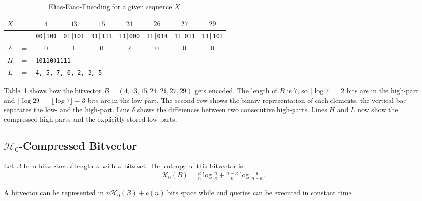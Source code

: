 \begin{Example}
  \begin{table}[htbp]
    \centering
    \begin{tabular}{ccccccccc}
      \toprule
      $X$ & $=$ & $4$ & $13$ & $15$ & $24$ & $26$ & $27$ & $29$ \\
      \midrule
      & &
      \texttt{00|100} &
      \texttt{01|101} &
      \texttt{01|111} &
      \texttt{11|000} &
      \texttt{11|010} &
      \texttt{11|011} &
      \texttt{11|101} \\

      $\delta$ & $=$ & $0$ & $1$ & $0$ & $2$ & $0$ & $0$ & $0$ \\
      $H$ & $=$ & \multicolumn{7}{l}{\texttt{1011001111}} \\
      $L$ & $=$ & \multicolumn{7}{l}{\texttt{4, 5, 7, 0, 2, 3, 5}} \\
      \bottomrule
    \end{tabular}
    \caption{Elias-Fano-Encoding for a given sequence $X$.}
    \label{tbl:eliasFanoExample}
  \end{table}
  Table~\ref{tbl:eliasFanoExample} shows how the bitvector $B=(4,13,15,24,26,27,29)$ gets encoded. The length of $B$ is $7$, so $\lfloor \log 7 \rfloor = 2$ bits are in the high-part and $\lceil \log 29 \rceil - \lfloor \log 7 \rfloor = 3$ bits are in the low-part. The second row shows the binary representation of each elements, the vertical bar separates the low- and the high-part. Line $\delta$ shows the differences between two consecutive high-parts. Lines $H$ and $L$ now show the compressed high-parts and the explicitly stored low-parts.
\end{Example}

\subsection{$\mathcal{H}_0$-Compressed Bitvector}

Let $B$ be a bitvector of length $n$ with $\kappa$ bits set. The entropy of this bitvector is
\begin{align}
  \mathcal{H}_0(B) = \frac{\kappa}{n}\log\frac{n}{\kappa} + \frac{n-\kappa}{n}\log\frac{n}{n - \kappa}
  \text{.}
\end{align}

\begin{Theorem}
  A bitvector can be represented in $n\mathcal{H}_0(B) + o(n)$ bits space while  and  queries can be executed in constant time.
\end{Theorem}

